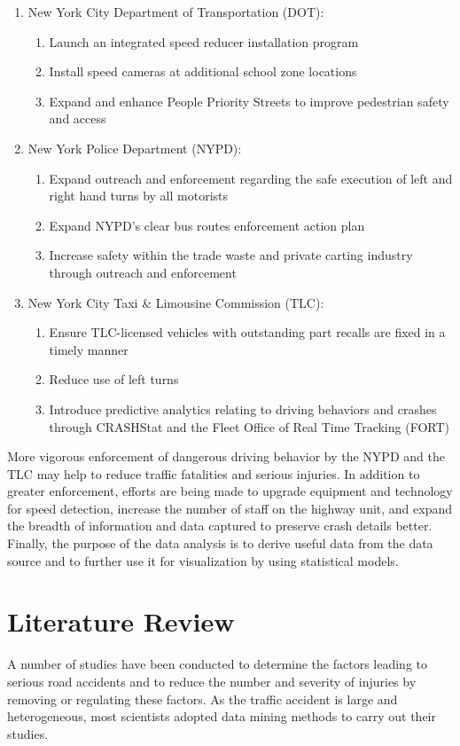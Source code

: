 \documentclass[conference]{IEEEtran}
\begin{document}
\begin{enumerate}  
	\item New York City Department of Transportation (DOT):
	\begin{enumerate}
		\item Launch an integrated speed reducer installation program
		\item Install speed cameras at additional school zone locations
		\item Expand and enhance People Priority Streets to improve pedestrian safety and access
	\end{enumerate}  
	\item New York Police Department (NYPD):
	\begin{enumerate}
		\item Expand outreach and enforcement regarding the safe execution of left and right hand turns by all motorists
		\item Expand NYPD's clear bus routes enforcement action plan
		\item Increase safety within the trade waste and private carting industry through outreach and enforcement   
	\end{enumerate}
	\item New York City Taxi \& Limousine Commission (TLC):
	\begin{enumerate}
		\item Ensure TLC-licensed vehicles with outstanding part recalls are fixed in a timely manner
		\item Reduce use of left turns
		\item Introduce predictive analytics relating to driving behaviors and crashes through CRASHStat and the Fleet Office of Real Time Tracking (FORT)
	\end{enumerate}
\end{enumerate}

More vigorous enforcement of dangerous driving behavior by the NYPD and the TLC may help to reduce traffic fatalities and serious injuries. In addition to greater enforcement, efforts are being made to upgrade equipment and technology for speed detection, increase the number of staff on the highway unit, and expand the breadth of information and data captured to preserve crash details better. Finally, the purpose of the data analysis is to derive useful data from the data source and to further use it for visualization by using statistical models.     
\section{Literature Review}
A number of studies have been conducted to determine the factors leading to serious road accidents and to reduce the number and severity of injuries by removing or regulating these factors. As the traffic accident is large and heterogeneous, most scientists adopted data mining methods to carry out their studies.
\end{document}
